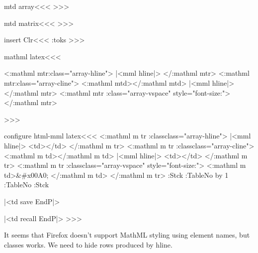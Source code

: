 {{{{{{\<mtd array\><<<
%
   \halignTD    \HCode{>}%
>>>

\<mtd matrix\><<<
%
   \halignTD    \HCode{>}%
>>>




\<insert Clr\><<<
\expandafter\tmp:toks\expandafter{\Clr}%
%
>>>





\<mathml latex\><<<
\def\:MM{m}
\def\mathml:hborder{%
\Configure{HBorder}
   {<\a:mathml mtr\Hnewline \mml:class="array-hline">} 
   {|<mml hline|>}
   {</\a:mathml mtr>}
   {<\a:mathml mtr\Hnewline \mml:class="array-cline">}
   {<\a:mathml mtd></\a:mathml mtd>}
   {|<mml hline|>}
   {</\a:mathml mtr>}
   {<\a:mathml mtr\Hnewline
         \mml:class="array-vspace" style="font-size:\HBorderspace">}
   {}
   {</\a:mathml mtr>}
  }

  \mathml:hborder
>>>

\<configure html-mml latex\><<<
\def\:MM{\ifmathml \a:mathml m\fi}
   {<\:MM tr\Hnewline 
       \ifmathml \expandafter\mml:class\else class\fi="array-hline">} 
   {\ifmathml|<mml hline|>\else
            <td></td>\fi} 
   {</\:MM tr>}
   {<\:MM tr\Hnewline
       \ifmathml \expandafter\mml:class\else class\fi ="array-cline">}
   {<\:MM td></\:MM td>}
   {\ifmathml|<mml hline|>\else
            <td></td>\fi}
   {</\:MM tr>}
   {<\:MM tr\Hnewline
         \ifmathml \expandafter\mml:class\else  class\fi="array-vspace"
         style="font-size:\HBorderspace">}
   {<\:MM td\Hnewline>\ifmathml\else\string&\#x00A0;\fi
      </\:MM td>}
   {</\:MM tr>}
   {\EndP
    \PushStack\Table:Stck\TableNo 
    \gHAdvance\Next:TableNo by 1  
    \global\let\TableNo=\Next:TableNo 
    }
   {\PopStack\Table:Stck\TableNo}
   {\halignTR
               \HCode{ id="TBL-\TableNo-\HRow-">}}
   {}
   {|<td save EndP|> %
   \halignTD \HCode{\Hnewline 
               id="TBL-\TableNo-\HRow-\HCol">}\ShowPar\par}
   {\ifvmode \IgnorePar \fi \EndP
               |<td recall EndP|>}
>>>

It seems that Firefox doesn't support MathML styling
using element names, but classes works. We need to hide
rows produced by hline.

}}}}}}
